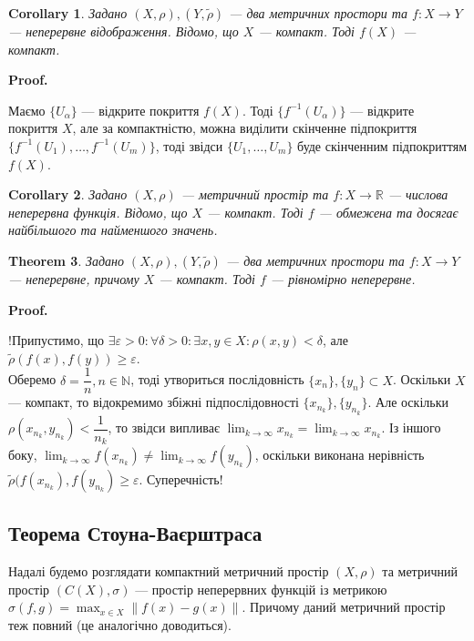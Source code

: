 \documentclass[a4paper, 10pt]{article}
\makeatletter
\theoremstyle{theoremdd}
\newtheorem{theorem}{Theorem}[subsection]
\theoremstyle{theoremdd}
\theoremstyle{theoremdd}
\theoremstyle{theoremdd}
\theoremstyle{theoremdd}
\theoremstyle{theoremdd}
\theoremstyle{theoremdd}
\theoremstyle{theoremdd}
\newtheorem{corollary}[theorem]{Corollary}
\renewenvironment{proof}[1][Proof.\\]{\par
\pushQED{\hfill \qed}%
\normalfont \topsep6\p@\@plus6\p@\relax
\trivlist
\item\relax
{\bfseries
#1\@addpunct{.}}\hspace\labelsep\ignorespaces
}{%
\popQED\endtrivlist\@endpefalse
}
\makeatother
\begin{document}
\begin{corollary}
Задано $(X,\rho), (Y,\tilde{\rho})$ --- два метричних простори та $f \colon X \to Y$ --- неперервне відображення. Відомо, що $X$ --- компакт. Тоді $f(X)$ --- компакт.
\end{corollary}

\begin{proof}
Маємо $\{U_\alpha\}$ --- відкрите покриття $f(X)$. Тоді $\{f^{-1}(U_\alpha)\}$ --- відкрите покриття $X$, але за компактністю, можна виділити скінченне підпокриття $\{f^{-1}(U_1),\dots,f^{-1}(U_m)\}$, тоді звідси $\{U_1,\dots,U_m\}$ буде скінченним підпокриттям $f(X)$.
\end{proof}

\begin{corollary}
Задано $(X,\rho)$ --- метричний простір та $f \colon X \to \mathbb{R}$ --- числова неперервна функція. Відомо, що $X$ --- компакт. Тоді $f$ --- обмежена та досягає найбільшого та найменшого значень.
\end{corollary}

\begin{theorem}
Задано $(X,\rho), (Y,\tilde{\rho})$ --- два метричних простори та $f \colon X \to Y$ --- неперервне, причому $X$ --- компакт. Тоді $f$ --- рівномірно неперервне.
\end{theorem}

\begin{proof}
!Припустимо, що $\exists \varepsilon > 0: \forall \delta > 0: \exists x,y \in X: \rho(x,y) < \delta$, але $\tilde{\rho}(f(x),f(y)) \geq \varepsilon$.\\
Оберемо $\delta = \dfrac{1}{n}, n \in \mathbb{N}$, тоді утвориться послідовність $\{x_n\}, \{y_n\} \subset X$. Оскільки $X$ --- компакт, то відокремимо збіжні підпослідовності $\{x_{n_k}\}, \{y_{n_k}\}$. Але оскільки $\rho(x_{n_k}, y_{n_k}) < \dfrac{1}{n_k}$, то звідси випливає $\displaystyle\lim_{k \to \infty} x_{n_k} = \lim_{k \to \infty} x_{n_k}$. Із іншого боку, $\displaystyle\lim_{k \to \infty} f(x_{n_k}) \neq \lim_{k \to \infty} f(y_{n_k})$, оскільки виконана нерівність $\tilde{\rho}(f(x_{n_k}), f(y_{n_k}) \geq \varepsilon$. Суперечність!
\end{proof}

\subsection{Теорема Стоуна-Ваєрштраса}
Надалі будемо розглядати компактний метричний простір $(X,\rho)$ та метричний простір $(C(X), \sigma)$ --- простір неперервних функцій із метрикою $\sigma(f,g) = \displaystyle\max_{x \in X}\| f(x) - g(x)\|$. Причому даний метричний простір теж повний (це аналогічно доводиться).
\end{document}
